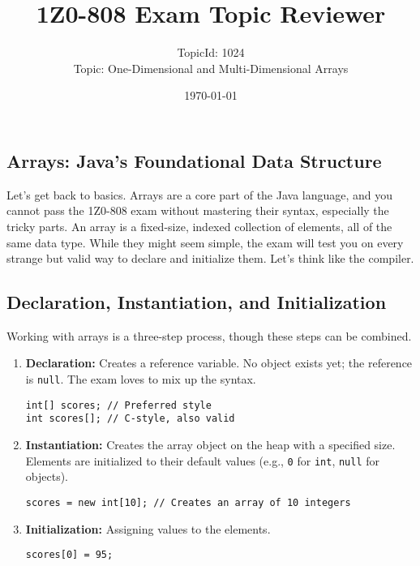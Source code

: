 \documentclass[12pt]{article}
\title{\textbf{1Z0-808 Exam Topic Reviewer}}
\author{TopicId: 1024 \\ Topic: One-Dimensional and Multi-Dimensional Arrays}
\date{\today}
\begin{document}
\maketitle
\newpage\begin{enumerate}[label=(\arabic*)]
\section*{Arrays: Java's Foundational Data Structure}
Let's get back to basics. Arrays are a core part of the Java language, and you cannot pass the 1Z0-808 exam without mastering their syntax, especially the tricky parts. An array is a fixed-size, indexed collection of elements, all of the same data type. While they might seem simple, the exam will test you on every strange but valid way to declare and initialize them. Let's think like the compiler.

\subsection{Declaration, Instantiation, and Initialization}
Working with arrays is a three-step process, though these steps can be combined.
\begin{enumerate}
    \item \textbf{Declaration:} Creates a reference variable. No object exists yet; the reference is \texttt{null}. The exam loves to mix up the syntax.
\begin{verbatim}
int[] scores; // Preferred style
int scores[]; // C-style, also valid
\end{verbatim}
    \item \textbf{Instantiation:} Creates the array object on the heap with a specified size. Elements are initialized to their default values (e.g., \texttt{0} for \texttt{int}, \texttt{null} for objects).
\begin{verbatim}
scores = new int[10]; // Creates an array of 10 integers
\end{verbatim}
    \item \textbf{Initialization:} Assigning values to the elements.
\begin{verbatim}
scores[0] = 95;
\end{verbatim}
\end{enumerate}


\end{enumerate}
\end{document}
